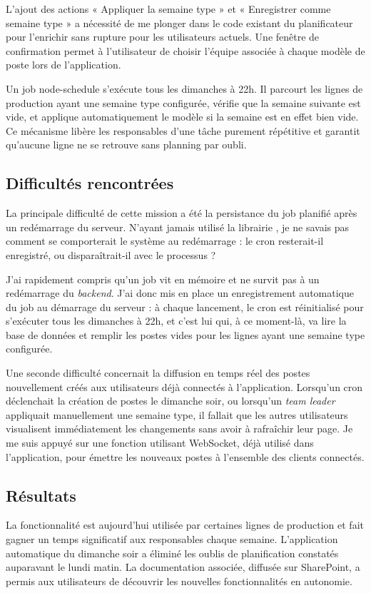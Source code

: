 \documentclass[pe1a]{tnreport} %
\begin{document}
L'ajout des actions « Appliquer la semaine type » et « Enregistrer 
comme semaine type » a nécessité de me plonger dans le code existant 
du planificateur pour l'enrichir sans rupture pour les utilisateurs 
actuels. Une fenêtre de confirmation permet à l'utilisateur de choisir 
l'équipe associée à chaque modèle de poste lors de l'application.


Un job node-schedule s'exécute tous les dimanches à 22h. Il parcourt 
les lignes de production ayant une semaine type configurée, vérifie 
que la semaine suivante est vide, et applique automatiquement le 
modèle si la semaine est en effet bien vide. Ce mécanisme libère les responsables d'une 
tâche purement répétitive et garantit qu'aucune ligne ne se retrouve 
sans planning par oubli.

\subsection{Difficultés rencontrées}
La principale difficulté de cette mission a été la persistance du 
job planifié après un redémarrage du serveur. N'ayant jamais utilisé la 
librairie , je ne savais pas comment se comporterait 
le système au redémarrage : le \gls{cron} resterait-il enregistré, 
ou disparaîtrait-il avec le processus ?

J'ai rapidement compris qu'un job  vit en mémoire et 
ne survit pas à un redémarrage du \textit{backend}. J'ai donc mis en place 
un enregistrement automatique du job au démarrage du serveur : à chaque 
lancement, le cron est réinitialisé pour s'exécuter tous les dimanches à 
22h, et c'est lui qui, à ce moment-là, va lire la base de données et 
remplir les postes vides pour les lignes ayant une semaine type configurée.

Une seconde difficulté concernait la diffusion en temps réel des 
postes nouvellement créés aux utilisateurs déjà connectés à l'application. 
Lorsqu'un \gls{cron} déclenchait la création de postes le dimanche soir, ou 
lorsqu'un \textit{team leader} appliquait manuellement une semaine type, 
il fallait que les autres utilisateurs visualisent immédiatement les 
changements sans avoir à rafraîchir leur page. Je me suis appuyé sur une fonction utilisant
\gls{WebSocket}, déjà utilisé dans l'application, pour émettre 
les nouveaux postes à l'ensemble des clients connectés.

\subsection{Résultats}
La fonctionnalité est aujourd'hui utilisée par certaines lignes de production et fait gagner un temps significatif aux responsables 
chaque semaine. L'application automatique du dimanche soir a éliminé les 
oublis de planification constatés auparavant le lundi matin. 
La documentation associée, diffusée sur SharePoint, a permis aux 
utilisateurs de découvrir les nouvelles fonctionnalités en autonomie.
\end{document}
